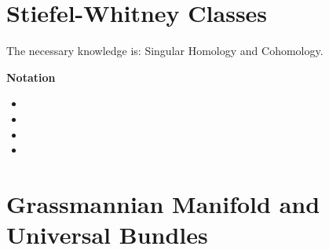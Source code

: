 \documentclass[Total.tex]{subfiles}
\begin{document}
	\chapter{Stiefel-Whitney Classes}
		
		The necessary knowledge is: Singular Homology and Cohomology.
	
		\textbf{Notation}
	
		\begin{axiom}
			\begin{itemize}
				\item 
				\item 
				\item 
				\item 
			\end{itemize}
		\end{axiom}
		
	\chapter{Grassmannian Manifold and Universal Bundles}
	
	
\end{document}

